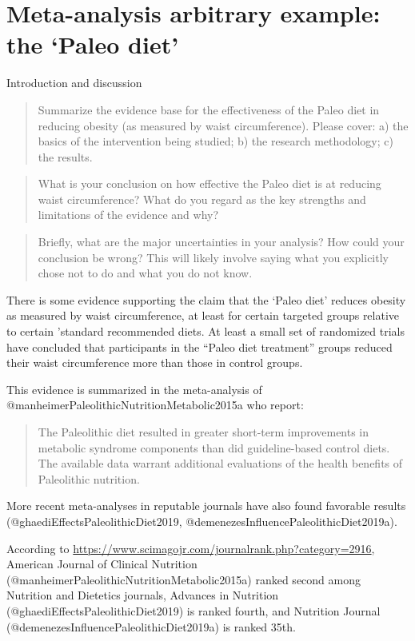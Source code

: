 \documentclass[]{article}
\author{}
\date{\vspace{-2.5em}}
\begin{document}
\hypertarget{paleo-example}{%
\section{Meta-analysis arbitrary example: the `Paleo
diet'}\label{paleo-example}}

Introduction and discussion

\begin{quote}
Summarize the evidence base for the effectiveness of the Paleo diet in
reducing obesity (as measured by waist circumference). Please cover: a)
the basics of the intervention being studied; b) the research
methodology; c) the results.
\end{quote}

\begin{quote}
What is your conclusion on how effective the Paleo diet is at reducing
waist circumference? What do you regard as the key strengths and
limitations of the evidence and why?
\end{quote}

\begin{quote}
Briefly, what are the major uncertainties in your analysis? How could
your conclusion be wrong? This will likely involve saying what you
explicitly chose not to do and what you do not know.
\end{quote}

There is some evidence supporting the claim that the `Paleo diet'
reduces obesity as measured by waist circumference, at least for certain
targeted groups relative to certain 'standard recommended diets. At
least a small set of randomized trials have concluded that participants
in the ``Paleo diet treatment'' groups reduced their waist circumference
more than those in control groups.

This evidence is summarized in the meta-analysis of
@manheimerPaleolithicNutritionMetabolic2015a who report:

\begin{quote}
The Paleolithic diet resulted in greater short-term improvements in
metabolic syndrome components than did guideline-based control diets.
The available data warrant additional evaluations of the health benefits
of Paleolithic nutrition.
\end{quote}

More recent meta-analyses in reputable journals have also found
favorable results (@ghaediEffectsPaleolithicDiet2019,
@demenezesInfluencePaleolithicDiet2019a).

According to
\href{www.scimagojr.com}{https://www.scimagojr.com/journalrank.php?category=2916},
American Journal of Clinical Nutrition
(@manheimerPaleolithicNutritionMetabolic2015a) ranked second among
Nutrition and Dietetics journals, Advances in Nutrition
(@ghaediEffectsPaleolithicDiet2019) is ranked fourth, and Nutrition
Journal (@demenezesInfluencePaleolithicDiet2019a) is ranked 35th.
\end{document}
